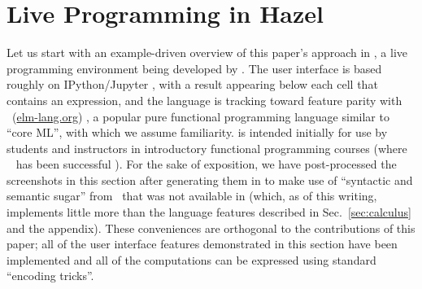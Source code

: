 \newcommand{\examplesSec}{Live Programming in Hazel}
\section{\protect\examplesSec} %
\label{sec:examples}




\newcommand{\overviewExample}[2]{\paragraph{Example {#1}: {#2}}}

Let us start with an example-driven overview of this paper's approach in \Hazel, a live programming environment being developed by \citet{HazelnutSNAPL}. The \Hazel user interface is based roughly on IPython/Jupyter \cite{PER-GRA:2007}, with a result appearing below each cell that contains an expression, and the \Hazel language is tracking toward feature parity with \Elm~(\url{elm-lang.org}) \cite{czaplicki2012elm,Elm}, a popular pure functional programming language similar to ``core ML'', with which we assume familiarity. \Hazel is intended initially for use by students and instructors in introductory functional programming courses (where \Elm~ has been successful \cite{DBLP:journals/corr/abs-1805-05125}). 
For the sake of 
exposition, we have post-processed the screenshots in this section after generating them in \Hazel to make use of  ``syntactic and semantic sugar'' from \Elm~that was not available in \Hazel (which, as of this writing, implements little more than the language features described in Sec.~\ref{sec:calculus} and the appendix). These conveniences are orthogonal to the contributions of this paper; all of the user interface features demonstrated in this section have been implemented and all of the computations can be expressed using standard ``encoding tricks''.







